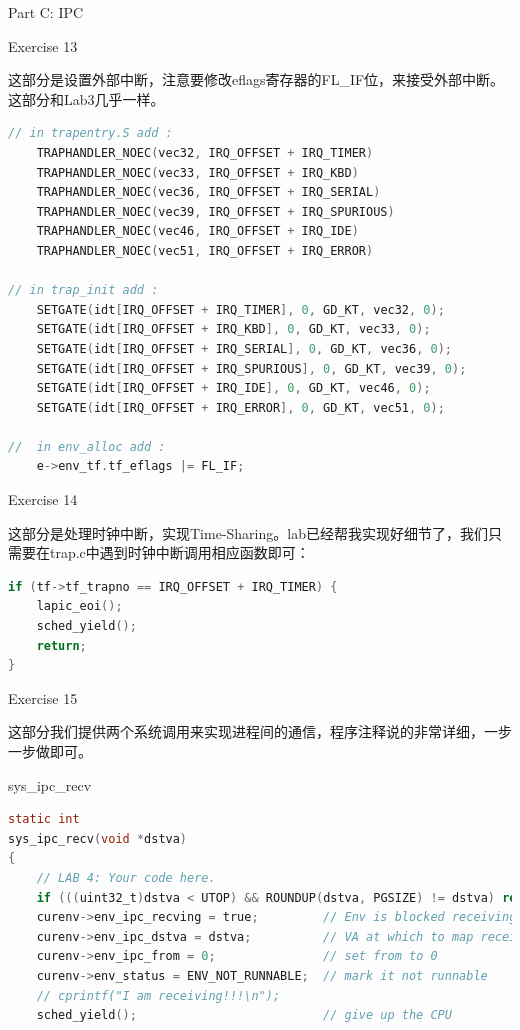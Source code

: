 \documentclass[GBK,winfonts,a4paper,10pt]{ctexart}
\begin{document}
\begin{section}{ Part C: IPC }

\begin{subsection}{ Exercise 13 }
\par
这部分是设置外部中断，注意要修改eflags寄存器的FL\_IF位，来接受外部中断。这部分和Lab3几乎一样。
\begin{lstlisting}[language = C]
// in trapentry.S add :
 	TRAPHANDLER_NOEC(vec32, IRQ_OFFSET + IRQ_TIMER)
 	TRAPHANDLER_NOEC(vec33, IRQ_OFFSET + IRQ_KBD)
 	TRAPHANDLER_NOEC(vec36, IRQ_OFFSET + IRQ_SERIAL)
 	TRAPHANDLER_NOEC(vec39, IRQ_OFFSET + IRQ_SPURIOUS)
 	TRAPHANDLER_NOEC(vec46, IRQ_OFFSET + IRQ_IDE)
 	TRAPHANDLER_NOEC(vec51, IRQ_OFFSET + IRQ_ERROR)
 	
// in trap_init add :
    SETGATE(idt[IRQ_OFFSET + IRQ_TIMER], 0, GD_KT, vec32, 0);
    SETGATE(idt[IRQ_OFFSET + IRQ_KBD], 0, GD_KT, vec33, 0);
    SETGATE(idt[IRQ_OFFSET + IRQ_SERIAL], 0, GD_KT, vec36, 0);
    SETGATE(idt[IRQ_OFFSET + IRQ_SPURIOUS], 0, GD_KT, vec39, 0);
    SETGATE(idt[IRQ_OFFSET + IRQ_IDE], 0, GD_KT, vec46, 0);
	SETGATE(idt[IRQ_OFFSET + IRQ_ERROR], 0, GD_KT, vec51, 0);

// 	in env_alloc add :
	e->env_tf.tf_eflags |= FL_IF;
\end{lstlisting}
\end{subsection}

\begin{subsection}{ Exercise 14 }
\par
这部分是处理时钟中断，实现Time-Sharing。lab已经帮我实现好细节了，我们只需要在trap.c中遇到时钟中断调用相应函数即可：
\begin{lstlisting}[language = C]
if (tf->tf_trapno == IRQ_OFFSET + IRQ_TIMER) {
	lapic_eoi();
	sched_yield();
	return;
}
\end{lstlisting}
\end{subsection}

\begin{subsection}{ Exercise 15 }
\par
这部分我们提供两个系统调用来实现进程间的通信，程序注释说的非常详细，一步一步做即可。

\begin{subsection}{ sys\_ipc\_recv }
\begin{lstlisting}[language = C]
static int
sys_ipc_recv(void *dstva)
{
	// LAB 4: Your code here.
	if (((uint32_t)dstva < UTOP) && ROUNDUP(dstva, PGSIZE) != dstva) return -E_INVAL;
	curenv->env_ipc_recving = true;			// Env is blocked receiving
	curenv->env_ipc_dstva = dstva;			// VA at which to map received page
	curenv->env_ipc_from = 0;				// set from to 0
	curenv->env_status = ENV_NOT_RUNNABLE;	// mark it not runnable
	// cprintf("I am receiving!!!\n");
	sched_yield();							// give up the CPU


\end{lstlisting}
\end{subsection}
\end{subsection}
\end{section}
\end{document}
